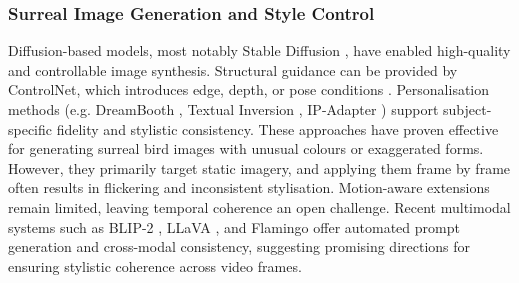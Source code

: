 \documentclass[final-report]{report-template}
\begin{document}
\subsubsection*{Surreal Image Generation and Style Control}
Diffusion-based models, most notably Stable Diffusion \cite{Rombach2022LDM}, have enabled high-quality and controllable image synthesis. Structural guidance can be provided by ControlNet, which introduces edge, depth, or pose conditions \cite{Zhang2023ControlNet}. Personalisation methods (e.g. DreamBooth \cite{Ruiz2023DreamBooth}, Textual Inversion \cite{Gal2022TextualInversion}, IP-Adapter \cite{Ye2023IPAdapter}) support subject-specific fidelity and stylistic consistency. These approaches have proven effective for generating surreal bird images with unusual colours or exaggerated forms. However, they primarily target static imagery, and applying them frame by frame often results in flickering and inconsistent stylisation. Motion-aware extensions remain limited, leaving temporal coherence an open challenge. Recent multimodal systems such as BLIP-2 \cite{Li2023BLIP2}, LLaVA \cite{Liu2023LLaVA}, and Flamingo \cite{Alayrac2022Flamingo} offer automated prompt generation and cross-modal consistency, suggesting promising directions for ensuring stylistic coherence across video frames.  
\end{document}
